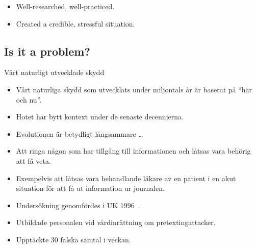 \begin{frame}
  \begin{remark}
    \begin{itemize}
      \item Well-researched, well-practiced.
      \item Created a credible, stressful situation.
    \end{itemize}
  \end{remark}
\end{frame}

\subsection{Is it a problem?}

\begin{frame}
  \begin{block}{Vårt naturligt utvecklade skydd}
    \begin{itemize}
      \item Vårt naturliga skydd som utvecklats under miljontals år är baserat på 
        \enquote{här och nu}.

      \item Hotet har bytt kontext under de senaste decennierna.

      \item Evolutionen är betydligt långsammare \dots

    \end{itemize}
  \end{block}
\end{frame}

\begin{frame}
  \begin{definition}[Pretexting]
    \begin{itemize}
      \item Att ringa någon som har tillgång till informationen och låtsas vara 
        behörig att få veta.

      \item Exempelvis att låtsas vara behandlande läkare av en patient i en akut 
        situation för att få ut information ur journalen.
    \end{itemize}
  \end{definition}
\end{frame}

\begin{frame}
  \begin{example}
    \begin{itemize}
      \item Undersökning genomfördes i UK 1996~\cite{Anderson2008sea}.
      \item Utbildade personalen vid vårdinrättning om pretextingattacker.
      \item Upptäckte 30 falska samtal i veckan.
    \end{itemize}
  \end{example}
\end{frame}

